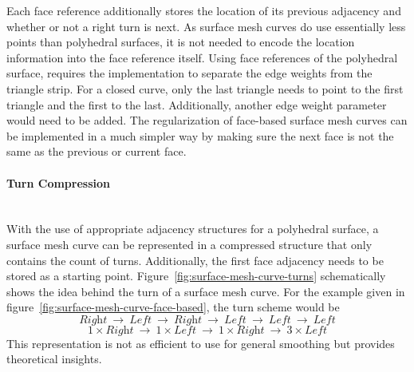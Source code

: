\documentclass{stdlocal}
\begin{document}
  Each face reference additionally stores the location of its previous adjacency and whether or not a right turn is next.
  As surface mesh curves do use essentially less points than polyhedral surfaces, it is not needed to encode the location information into the face reference itself.
  Using face references of the polyhedral surface, requires the implementation to separate the edge weights from the triangle strip.
  For a closed curve, only the last triangle needs to point to the first triangle and the first to the last.
  Additionally, another edge weight parameter would need to be added.
  The regularization of face-based surface mesh curves can be implemented in a much simpler way by making sure the next face is not the same as the previous or current face.

  \paragraph{Turn Compression}\hfill\\
  With the use of appropriate adjacency structures for a polyhedral surface, a surface mesh curve can be represented in a compressed structure that only contains the count of turns.
  Additionally, the first face adjacency needs to be stored as a starting point.
  Figure~\ref{fig:surface-mesh-curve-turns} schematically shows the idea behind the turn of a surface mesh curve.
  For the example given in figure~\ref{fig:surface-mesh-curve-face-based}, the turn scheme would be
  \[
    \textit{Right}
    \ \longrightarrow\
    \textit{Left}
    \ \longrightarrow\
    \textit{Right}
    \ \longrightarrow\
    \textit{Left}
    \ \longrightarrow\
    \textit{Left}
    \ \longrightarrow\
    \textit{Left}
  \]
  \[
    1\times\textit{Right}
    \ \longrightarrow\
    1\times\textit{Left}
    \ \longrightarrow\
    1\times\textit{Right}
    \ \longrightarrow\
    3\times\textit{Left}
  \]
  This representation is not as efficient to use for general smoothing but provides theoretical insights.
\end{document}
